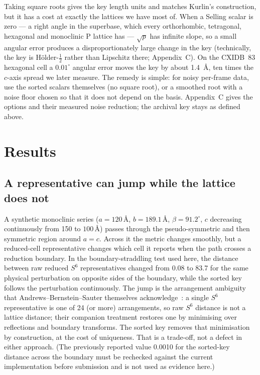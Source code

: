 \documentclass[11pt]{article}
\newcommand{\Ang}{\text{\AA}}
\begin{document}
Taking square roots gives the key length units and matches Kurlin's construction, but it has a cost at exactly the lattices we have most of. When a Selling scalar is zero --- a right angle in the superbase, which every orthorhombic, tetragonal, hexagonal and monoclinic P lattice has --- $\sqrt{p}$ has infinite slope, so a small angular error produces a disproportionately large change in the key (technically, the key is H\"older-$\tfrac12$ rather than Lipschitz there; Appendix~C). On the CXIDB~83 hexagonal cell a $0.01^\circ$ angular error moves the key by about \SI{1.4}{\angstrom}, ten times the $c$-axis spread we later measure. The remedy is simple: for noisy per-frame data, use the sorted scalars themselves (no square root), or a smoothed root with a noise floor chosen so that it does not depend on the basis. Appendix~C gives the options and their measured noise reduction; the archival key stays as defined above.

\section{Results}

\subsection{A representative can jump while the lattice does not}

A synthetic monoclinic series ($a=120\,\Ang$, $b=189.1\,\Ang$, $\beta=91.2^\circ$, $c$ decreasing continuously from 150 to $100\,\Ang$) passes through the pseudo-symmetric and then symmetric region around $a=c$. Across it the metric changes smoothly, but a reduced-cell representative changes which cell it reports when the path crosses a reduction boundary. In the boundary-straddling test used here, the distance between raw reduced $S^6$ representatives changed from 0.08 to 83.7 for the same physical perturbation on opposite sides of the boundary, while the sorted key follows the perturbation continuously. The jump is the arrangement ambiguity that Andrews--Bernstein--Sauter themselves acknowledge~\cite{abs2019}: a single $S^6$ representative is one of 24 (or more) arrangements, so raw $S^6$ distance is not a lattice distance; their companion treatment restores one by minimising over reflections and boundary transforms. The sorted key removes that minimisation by construction, at the cost of uniqueness. That is a trade-off, not a defect in either approach. (The previously reported value 0.0010 for the sorted-key distance across the boundary must be rechecked against the current implementation before submission and is not used as evidence here.)
\end{document}
